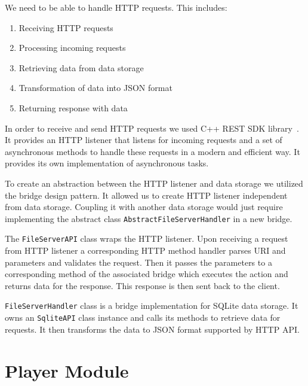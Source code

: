 We need to be able to handle HTTP requests. This includes:
\begin{enumerate}
    \item Receiving HTTP requests
    \item Processing incoming requests
    \item Retrieving data from data storage
    \item Transformation of data into JSON format
    \item Returning response with data
\end{enumerate}

In order to receive and send HTTP requests we used C++ REST SDK library~\citep{cpprestsdk}. It provides an HTTP listener that listens for incoming requests and a set of asynchronous methods to handle these requests in a modern and efficient way. It provides its own implementation of asynchronous tasks.
\par
To create an abstraction between the HTTP listener and data storage we utilized the bridge design pattern. It allowed us to create HTTP listener independent from data storage. Coupling it with another data storage would just require implementing the abstract class \texttt{AbstractFileServerHandler} in a new bridge.
\par
The \texttt{FileServerAPI} class wraps the HTTP listener. Upon receiving a request from HTTP listener a corresponding HTTP method handler parses URI and parameters and validates the request. Then it passes the parameters to a corresponding method of the associated bridge which executes the action and returns data for the response. This response is then sent back to the client.
\par
\texttt{FileServerHandler} class is a bridge implementation for SQLite data storage. It owns an \texttt{SqliteAPI} class instance and calls its methods to retrieve data for requests. It then transforms the data to JSON format supported by HTTP API.

\section{Player Module}

